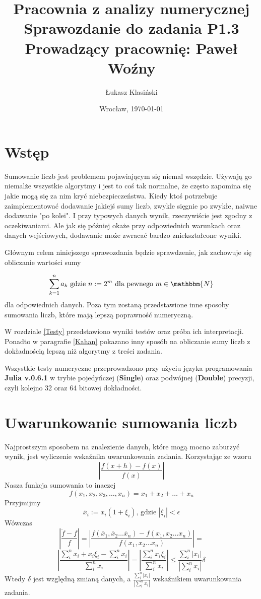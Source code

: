 \documentclass[11pt, wide]{article}
\date{Wrocław, \today}
\title{\LARGE\textbf{Pracownia z analizy numerycznej}\\Sprawozdanie do zadania \textbf{P1.3}\\
    Prowadzący pracownię: Paweł Woźny}
\author{Łukasz Klasiński}
\begin{document}
    \maketitle
    \thispagestyle{empty}
    \section{Wstęp}
    Sumowanie liczb jest problemem pojawiającym się niemal wszędzie. Używają go 
    niemalże wszystkie algorytmy i jest to coś tak normalne, że często zapomina 
    się jakie mogą się za nim kryć niebezpieczeństwa. Kiedy ktoś potrzebuje 
    zaimplementować dodawanie jakiejś sumy liczb, zwykle sięgnie po zwykłe, 
    naiwne dodawanie "po kolei". I przy typowych danych wynik, rzeczywiście 
    jest zgodny z oczekiwaniami. Ale jak się później okaże przy odpowiednich 
    warunkach oraz danych wejściowych, dodawanie może zwracać bardzo zniekształcone 
    wyniki.

    Głównym celem niniejszego sprawozdania będzie sprawdzenie, jak zachowuje się 
    obliczanie wartości sumy
    
    \begin{equation}\label{sum_eq}
        \sum_{k=1}^{n}a_{k} \text{ gdzie } n := 2^m \text{ dla pewnego }m \in \mathbbm{N} 
    \end{equation}
    dla odpowiednich danych. Poza tym zostaną przedstawione inne sposoby sumowania 
    liczb, które mają lepszą poprawność numeryczną.


    W rozdziale \ref{Testy} przedstawiono wyniki testów oraz próba ich interpretacji. 
    Ponadto w paragrafie \ref{Kahan} pokazano inny sposób na obliczanie sumy liczb z dokładnością 
    lepszą niż algorytmy z treści zadania.
    
    
    Wszystkie testy numeryczne przeprowadzono przy użyciu języka programowania \textbf{Julia v.0.6.1} w trybie 
    pojedyńczej (\textbf{Single}) oraz podwójnej (\textbf{Double}) precyzji, 
    czyli kolejno 32 oraz 64 bitowej dokładności.
    
    \section{Uwarunkowanie sumowania liczb}\label{uwarunkowanie}
    Najprostszym sposobem na znalezienie danych, które mogą mocno zaburzyć wynik, jest 
    wyliczenie wskaźnika uwarunkowania zadania. Korzystając ze wzoru
\begin{equation}
    |\frac{f(x + h) - f(x)}{f(x)}|
\end{equation}
    Nasza funkcja sumowania to inaczej  $$ f(x_1, x_2, x_3, \ldots, x_n) = x_1 + x_2 + \ldots + x_n $$
    Przyjmijmy $$\ddot{x_i} := x_i(1 + \xi_i) \text{, gdzie } |\xi_i| < \epsilon $$
    Wówczas
$$
    |\frac{\ddot{f} - f}{f}| = |\frac{f(\ddot{x_1},\ddot{x_2} \ldots \ddot{x_n}) - f(x_1, x_2 \ldots x_n)}{f(x_1,x_2 \ldots x_n)}| = 
$$
$$
    |\frac{\sum_i^{n}x_i + x_i\xi_i - \sum_i^{n}x_i}{\sum_i^{n}x_i}| = 
    |\frac{\sum_i^{n}x_i\xi_i}{\sum_i^{n}x_i}| \leq  \frac{\sum_i^{n}|x_i|}{|\sum_i^{n}x_i|}\delta
$$
    Wtedy $\delta$ jest względną zmianą danych, a $\frac{\sum_i^{n}|x_i|}{|\sum_i^{n}x_i|}$ 
    wskaźnikiem uwarunkowania zadania.
\end{document}
